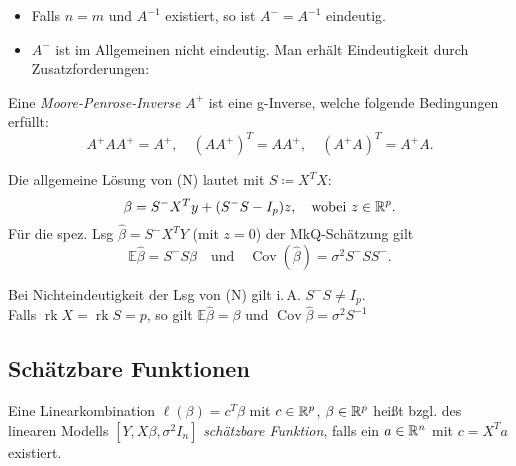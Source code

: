 \documentclass{cheat-sheet}
\newcommand{\E}{\mathbb{E}} %
\DeclareMathOperator{\rk}{rk} %
\DeclareMathOperator{\cov}{Cov} %
\begin{document}
\begin{bem}
  \begin{itemize}
    \item Falls $n = m$ und $A^{-1}$ existiert, so ist $A^{-} = A^{-1}$ eindeutig.
    \item $A^{-}$ ist im Allgemeinen nicht eindeutig.
    Man erhält Eindeutigkeit durch Zusatzforderungen:
  \end{itemize}
\end{bem}

\begin{defn}
  Eine \emph{Moore-Penrose-Inverse} $A^{+}$ ist eine g-Inverse, welche folgende Bedingungen erfüllt:
  \[
    A^{+} A A^{+} = A^{+}, \quad
    (A A^{+})^T = A A^{+}, \quad
    (A^{+} A)^T = A^{+} A.
  \]
\end{defn}

\begin{samepage}

\begin{satz}
  Die allgemeine Lösung von (N) lautet mit $S \coloneqq X^T X$:
  \[
    \beta = S^{-} X^T y + (S^{-} S - I_p) z, \quad
    \text{wobei } z \in \mathbb{R}^p.
  \]
  Für die spez. Lsg
  $\hat{\beta} = S^{-} X^T Y$
  (mit $z = 0$)
  der MkQ-Schätzung gilt
  \[
    \E \hat{\beta} = S^{-} S \beta
    \quad \text{und} \quad
    \cov(\hat{\beta}) = \sigma^2 S^{-} S S^{-}.
  \]
\end{satz}

\begin{bem}
  Bei Nichteindeutigkeit der Lsg von (N) gilt i.\,A. $S^{-} S \neq I_p$. \\
  Falls $\rk X = \rk S = p$, so gilt $\E \hat{\beta} = \beta$ und $\cov \hat{\beta} = \sigma^2 S^{-1}$
\end{bem}

\subsection{Schätzbare Funktionen}

\end{samepage}

\begin{defn}
  Eine Linearkombination $\ell(\beta) = c^T \beta$ mit $c \in \mathbb{R}^p$, $\beta \in \mathbb{R}^p$ heißt bzgl. des linearen Modells $[Y, X \beta, \sigma^2 I_n]$ \emph{schätzbare Funktion}, falls ein $a \in \mathbb{R}^n$ mit $c = X^T a$ existiert.
\end{defn}
\end{document}
